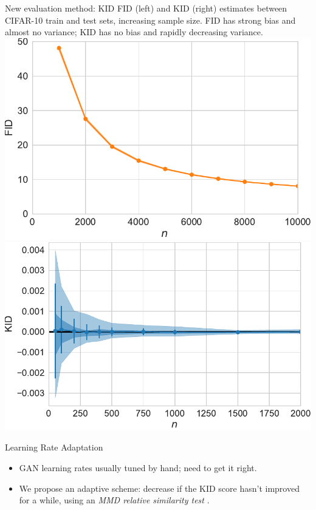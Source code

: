 \documentclass[xcolor={table}]{beamer}
\begin{document}
\begin{frame}{}
\begin{columns}[T, totalwidth=\textwidth]
\begin{column}{.32\textwidth}
\begin{block}{New evaluation method: KID}
      FID (left) and KID (right) estimates between CIFAR-10 train and test sets, increasing sample size.
      FID has strong bias and almost no variance;
      KID has no bias and rapidly decreasing variance.
      \\
      \includegraphics[width=.48\columnwidth]{figs/fid-bias.pdf}
      \includegraphics[width=.48\columnwidth]{figs/mmd-unbiased.pdf}

    \end{block}

    \begin{block}{Learning Rate Adaptation}
      \begin{itemize}
        \item GAN learning rates usually tuned by hand; need to get it right.
        \item We propose an adaptive scheme: decrease if the KID score hasn't improved for a while, using an \emph{MMD relative similarity test} \parencite{3sample}.
      \end{itemize}
    \end{block}

    \printbibliography
  \end{column}

\end{columns}


\end{frame}
\end{document}
